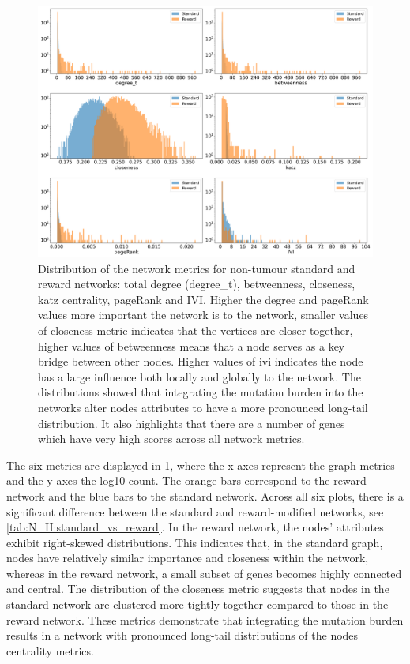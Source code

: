 \begin{figure}[!b]    
    \centering
    \includegraphics[width=1.0\textwidth,height=1.0\textheight,keepaspectratio]{Sections/Network_II/validation/net_metrics_Standard_Reward.png}
    \caption[Network metrics for non-tumour graphs]{Distribution of the network metrics for non-tumour standard and reward networks: total degree (degree\_t), betweenness, closeness, katz centrality, pageRank and IVI.  Higher the degree and pageRank values more important the network is to the network, smaller values of closeness metric indicates that the vertices are closer together, higher values of betweenness means that a node serves as a key bridge between other nodes. Higher values of \acrlong{ivi} indicates the node has a large influence both locally and globally to the network. The distributions showed that integrating the mutation burden into the networks alter nodes attributes to have a more pronounced long-tail distribution. It also highlights that there are a number of genes which have very high scores across  all network metrics.}
    \label{fig:N_II:net_metric_sig_std}
\end{figure}

The six metrics are displayed in \cref{fig:N_II:net_metric_sig_std}, where the x-axes represent the graph metrics and the y-axes the log10 count. The orange bars correspond to the reward network and the blue bars to the standard network. Across all six plots, there is a significant difference between the standard and reward-modified networks, see \cref{tab:N_II:standard_vs_reward}. In the reward network, the nodes' attributes exhibit right-skewed distributions. This indicates that, in the standard graph, nodes have relatively similar importance and closeness within the network, whereas in the reward network, a small subset of genes becomes highly connected and central. The distribution of the closeness metric suggests that nodes in the standard network are clustered more tightly together compared to those in the reward network. These metrics demonstrate that integrating the mutation burden results in a network with pronounced long-tail distributions of the nodes centrality metrics.

